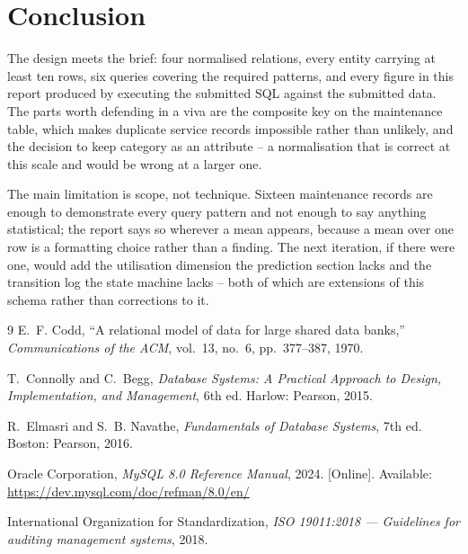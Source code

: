 \documentclass[conference,9pt]{IEEEtran}
\begin{document}
\section{Conclusion}
The design meets the brief: four normalised relations, every entity carrying at
least ten rows, six queries covering the required patterns, and every figure in
this report produced by executing the submitted SQL against the submitted data.
The parts worth defending in a viva are the composite key on the maintenance
table, which makes duplicate service records impossible rather than unlikely,
and the decision to keep category as an attribute -- a normalisation that is
correct at this scale and would be wrong at a larger one.

The main limitation is scope, not technique. Sixteen maintenance records are
enough to demonstrate every query pattern and not enough to say anything
statistical; the report says so wherever a mean appears, because a mean over
one row is a formatting choice rather than a finding. The next iteration, if
there were one, would add the utilisation dimension the prediction section
lacks and the transition log the state machine lacks -- both of which are
extensions of this schema rather than corrections to it.

\begin{thebibliography}{9}
E.~F. Codd, ``A relational model of data for large shared data banks,''
\emph{Communications of the ACM}, vol.~13, no.~6, pp.~377--387, 1970.

T.~Connolly and C.~Begg, \emph{Database Systems: A Practical Approach to
Design, Implementation, and Management}, 6th ed. Harlow: Pearson, 2015.

R.~Elmasri and S.~B. Navathe, \emph{Fundamentals of Database Systems},
7th ed. Boston: Pearson, 2016.

Oracle Corporation, \emph{MySQL 8.0 Reference Manual}, 2024.
[Online]. Available: \url{https://dev.mysql.com/doc/refman/8.0/en/}

International Organization for Standardization, \emph{ISO 19011:2018 ---
Guidelines for auditing management systems}, 2018.
\end{thebibliography}
\end{document}
